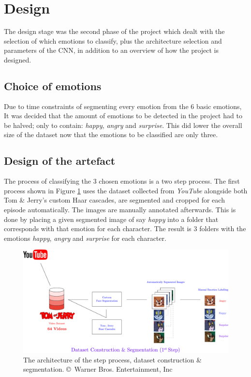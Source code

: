 \documentclass[report, 11pt, oneside]{dissertation}
\begin{document}
\section{Design}

The design stage was the second phase of the project which dealt with the selection of which emotions to classify, plus the architecture selection and parameters of the CNN, in addition to an overview of how the project is designed. 

\subsection{Choice of emotions}

Due to time constraints of segmenting every emotion from the 6 basic emotions, It was decided that the amount of emotions to be detected in the project had to be halved; only to contain: \textit{happy}, \textit{angry} and \textit{surprise}. This did lower the overall size of the dataset now that the emotions to be classified are only three.

\subsection{Design of the artefact}

The process of classifying the 3 chosen emotions is a two step process. The first process shown in Figure \ref{fig:design_1} uses the dataset collected from \textit{YouTube} alongside both Tom \& Jerry's custom Haar cascades, are segmented and cropped for each episode automatically. The images are manually annotated afterwards. This is done by placing a given segmented image of say \textit{happy} into a folder that corresponds with that emotion for each character. The result is 3 folders with the emotions \textit{happy}, \textit{angry} and \textit{surprise} for each character.

\begin{figure}[!htb]
   \centering
	\includegraphics[scale=0.45]{figure_24.pdf}
	\caption[The architecture of the  step process, dataset construction \& segmentation.]{The architecture of the  step process, dataset construction \& segmentation. \copyright \ Warner Bros. Entertainment, Inc}
	\label{fig:design_1}
\end{figure}
\end{document}
